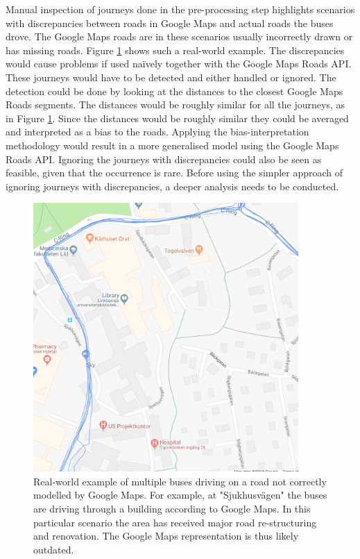 Manual inspection of journeys done in the pre-processing step highlights scenarios with discrepancies between roads in Google Maps and actual roads the buses drove.
The Google Maps roads are in these scenarios usually incorrectly drawn or has missing roads.
Figure \ref{fig:gps-map-problem} shows such a real-world example.
The discrepancies would cause problems if used naïvely together with the Google Maps Roads API.
These journeys would have to be detected and either handled or ignored.
The detection could be done by looking at the distances to the closest Google Maps Roads segments.
The distances would be roughly similar for all the journeys, as in Figure \ref{fig:gps-map-problem}.
Since the distances would be roughly similar they could be averaged and interpreted as a bias to the roads.
Applying the bias-interpretation methodology would result in a more generalised model using the Google Maps Roads API.
Ignoring the journeys with discrepancies could also be seen as feasible, given that the occurrence is rare.
Before using the simpler approach of ignoring journeys with discrepancies, a deeper analysis needs to be conducted.

\begin{figure}[ht!]
    \centering
    \includegraphics[width=0.9\textwidth]{figures/gps_map_problem}
    \caption[Real-world example of multiple buses driving on a road not correctly modelled by Google Maps]
    {\small Real-world example of multiple buses driving on a road not correctly modelled by Google Maps.
    For example, at "Sjukhusvägen" the buses are driving through a building according to Google Maps.
    In this particular scenario the area has received major road re-structuring and renovation.
    The Google Maps representation is thus likely outdated.}
    \label{fig:gps-map-problem}
\end{figure}

